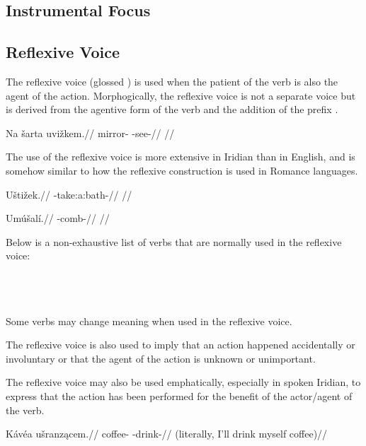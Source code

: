 \subsection{Instrumental Focus}


\subsection{Reflexive Voice}

The reflexive voice (glossed ) is used when the patient of the verb is also the agent of the action. Morphogically, the reflexive voice is not a separate voice but is derived from the agentive form of the verb and the addition of the prefix .

\pex
\begingl
\gla Na \v{s}arta uvi\v{z}kem.//
\glb {} mirror- -see-//
\glft {}//
\endgl
\xe

The use of the reflexive voice is more extensive in Iridian than in English, and is somehow similar to how the reflexive construction is used in Romance languages.

\pex
\begingl
\gla U\v{s}ti\v{z}ek.//
\glb {}-take:a:bath-//
\glft {}//
\endgl
\xe

\pex
\begingl
\gla Um\'u\v{s}al\'i.//
\glb {}-comb-//
\glft {}//
\endgl
\xe

Below is a non-exhaustive list of verbs that are normally used in the reflexive voice:
\bigskip

\noindent 
{} \\
 \\
 \\

Some verbs may change meaning when used in the reflexive voice.


The reflexive voice is also used to imply that an action happened accidentally or involuntary or that the agent of the action is unknown or unimportant.

The reflexive voice may also be used emphatically, especially in spoken Iridian, to express that the action has been performed for the benefit of the actor/agent of the verb.

\pex
\begingl
\gla K\'av\'ea u\v{s}ranz\k{a}cem.//
\glb coffee- -drink-//
\glft {} (literally, I'll drink myself coffee)//
\endgl
\xe

